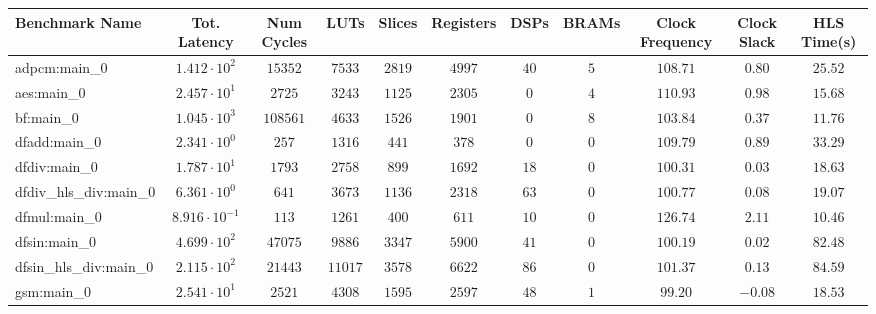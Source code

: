 \begin{tabular}{|l|c|c|c|c|c|c|c|c|c|c|}
\hline
Benchmark Name          & Tot. Latency            & Num Cycles & LUTs      & Slices    & Registers & DSPs    & BRAMs  & Clock Frequency & Clock Slack & HLS Time(s) \\
\hline
adpcm:main\_0           & $ 1.412 \cdot 10^{2}  $ & $ 15352  $ & $ 7533  $ & $ 2819  $ & $ 4997  $ & $ 40  $ & $ 5  $ & $ 108.71      $ & $ 0.80    $ & $ 25.52   $ \\
aes:main\_0             & $ 2.457 \cdot 10^{1}  $ & $ 2725   $ & $ 3243  $ & $ 1125  $ & $ 2305  $ & $ 0   $ & $ 4  $ & $ 110.93      $ & $ 0.98    $ & $ 15.68   $ \\
bf:main\_0              & $ 1.045 \cdot 10^{3}  $ & $ 108561 $ & $ 4633  $ & $ 1526  $ & $ 1901  $ & $ 0   $ & $ 8  $ & $ 103.84      $ & $ 0.37    $ & $ 11.76   $ \\
dfadd:main\_0           & $ 2.341 \cdot 10^{0}  $ & $ 257    $ & $ 1316  $ & $ 441   $ & $ 378   $ & $ 0   $ & $ 0  $ & $ 109.79      $ & $ 0.89    $ & $ 33.29   $ \\
dfdiv:main\_0           & $ 1.787 \cdot 10^{1}  $ & $ 1793   $ & $ 2758  $ & $ 899   $ & $ 1692  $ & $ 18  $ & $ 0  $ & $ 100.31      $ & $ 0.03    $ & $ 18.63   $ \\
dfdiv\_hls\_div:main\_0 & $ 6.361 \cdot 10^{0}  $ & $ 641    $ & $ 3673  $ & $ 1136  $ & $ 2318  $ & $ 63  $ & $ 0  $ & $ 100.77      $ & $ 0.08    $ & $ 19.07   $ \\
dfmul:main\_0           & $ 8.916 \cdot 10^{-1} $ & $ 113    $ & $ 1261  $ & $ 400   $ & $ 611   $ & $ 10  $ & $ 0  $ & $ 126.74      $ & $ 2.11    $ & $ 10.46   $ \\
dfsin:main\_0           & $ 4.699 \cdot 10^{2}  $ & $ 47075  $ & $ 9886  $ & $ 3347  $ & $ 5900  $ & $ 41  $ & $ 0  $ & $ 100.19      $ & $ 0.02    $ & $ 82.48   $ \\
dfsin\_hls\_div:main\_0 & $ 2.115 \cdot 10^{2}  $ & $ 21443  $ & $ 11017 $ & $ 3578  $ & $ 6622  $ & $ 86  $ & $ 0  $ & $ 101.37      $ & $ 0.13    $ & $ 84.59   $ \\
gsm:main\_0             & $ 2.541 \cdot 10^{1}  $ & $ 2521   $ & $ 4308  $ & $ 1595  $ & $ 2597  $ & $ 48  $ & $ 1  $ & $ 99.20       $ & $ -0.08   $ & $ 18.53   $ \\

\end{tabular}
